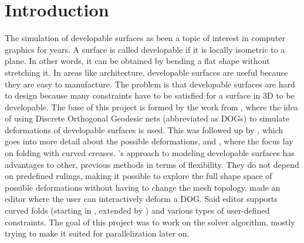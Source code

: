 \documentclass[a4paper,twoside,12pt,nochapterprefix]{scrbook}
\begin{document}
\chapter{Introduction}\label{sec:intro}\label{sec:prev_work}
The simulation of developable surfaces as been a topic of interest in computer graphics for years. A surface is called developable if it is locally isometric to a plane. In other words, it can be obtained by bending a flat shape without stretching it. In areas like architecture, developable surfaces are useful because they are easy to manufacture. The problem is that developable surfaces are hard to design because many constraints have to be satisfied for a surface in 3D to be developable.\newline
The base of this project is formed by the work from \cite{Rabinovich:DogNets:2018}, where the idea of using Discrete Orthogonal Geodesic nets (abbreviated as DOGs) to simulate deformations of developable surfaces is used. This was followed up by \cite{Rabinovich:DogShapeSpace:2018}, which goes into more detail about the possible deformations, and \cite{Rabinovich:CurvedFolds:2019}, where the focus lay on folding with curved creases.\newline
\cite{Rabinovich:DogNets:2018}'s approach to modeling developable surfaces has advantages to other, previous methods in terms of flexibility. They do not depend on predefined rulings, making it possible to explore the full shape space of possible deformations without having to change the mesh topology.\newline %
\cite{Rabinovich:DogNets:2018} made an editor where the user can interactively deform a DOG. Said editor supports curved folds (starting in \cite{Rabinovich:DogShapeSpace:2018}, extended by \cite{Rabinovich:CurvedFolds:2019}) and various types of user-defined constraints. The goal of this project was to work on the solver algorithm, mostly trying to make it suited for parallelization later on.\newline

\end{document}
